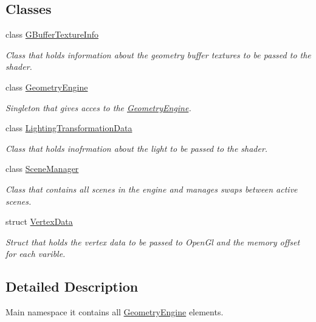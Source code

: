 \subsection*{Classes}
\begin{DoxyCompactItemize}
\item 
class \mbox{\hyperlink{class_geometry_engine_1_1_g_buffer_texture_info}{G\+Buffer\+Texture\+Info}}
\begin{DoxyCompactList}\small\item\em Class that holds information about the geometry buffer textures to be passed to the shader. \end{DoxyCompactList}\item 
class \mbox{\hyperlink{class_geometry_engine_1_1_geometry_engine}{Geometry\+Engine}}
\begin{DoxyCompactList}\small\item\em Singleton that gives acces to the \mbox{\hyperlink{class_geometry_engine_1_1_geometry_engine}{Geometry\+Engine}}. \end{DoxyCompactList}\item 
class \mbox{\hyperlink{class_geometry_engine_1_1_lighting_transformation_data}{Lighting\+Transformation\+Data}}
\begin{DoxyCompactList}\small\item\em Class that holds inofrmation about the light to be passed to the shader. \end{DoxyCompactList}\item 
class \mbox{\hyperlink{class_geometry_engine_1_1_scene_manager}{Scene\+Manager}}
\begin{DoxyCompactList}\small\item\em Class that contains all scenes in the engine and manages swaps between active scenes. \end{DoxyCompactList}\item 
struct \mbox{\hyperlink{struct_geometry_engine_1_1_vertex_data}{Vertex\+Data}}
\begin{DoxyCompactList}\small\item\em Struct that holds the vertex data to be passed to Open\+Gl and the memory offset for each varible. \end{DoxyCompactList}\end{DoxyCompactItemize}


\subsection{Detailed Description}
Main namespace it contains all \mbox{\hyperlink{namespace_geometry_engine}{Geometry\+Engine}} elements. 